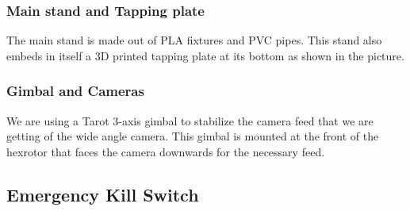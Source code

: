 \documentclass[12pt]{article}
\begin{document}
	\subsubsection{Main stand and Tapping plate}
	The main stand is made out of PLA fixtures and PVC pipes. This stand also embeds in itself a 3D printed tapping plate at its bottom as shown in the picture. 
	\subsubsection{Gimbal and Cameras}
	We are using a Tarot 3-axis gimbal to stabilize the camera feed that we are getting of the wide angle camera. This gimbal is mounted at the front of the hexrotor that faces the camera downwards for the necessary feed.
	\subsection{Emergency Kill Switch}
\end{document}
